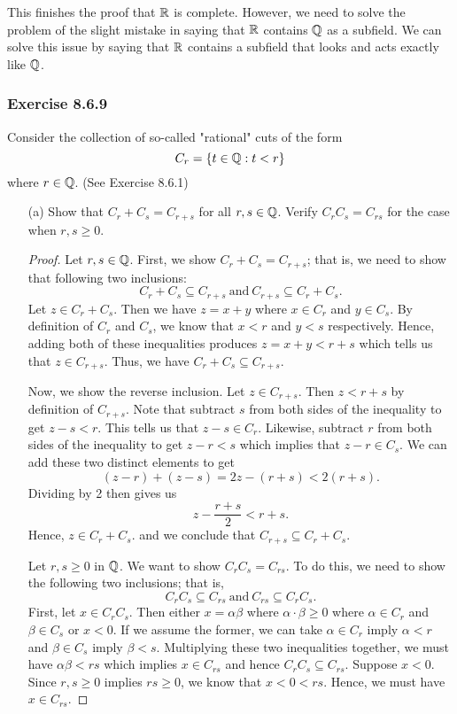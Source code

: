 This finishes the proof that \( \mathbb{R}  \) is complete. However, we need to solve the problem of the slight mistake in saying that \( \mathbb{R}  \) contains \( \mathbb{Q}  \) as a subfield. We can solve this issue by saying that \( \mathbb{R}  \) contains a subfield that looks and acts exactly like \( \mathbb{Q}  \).

\subsubsection{Exercise 8.6.9} Consider the collection of so-called "rational" cuts of the form 
\[  C_{r} = \{ t \in \mathbb{Q}  : t < r \}  \]
where \( r \in \mathbb{Q}  \). (See Exercise 8.6.1)
\begin{enumerate}
    \item[(a)] Show that \( C_{r} + C_{s} = C_{r+s} \) for all \( r,s \in \mathbb{Q}  \). Verify \( C_{r} C_{s} = C_{rs} \) for the case when \( r, s \geq 0  \).
        \begin{proof}
       Let \( r,s \in \mathbb{Q}  \). First, we show \( C_{r} + C_{s} = C_{r+s} \); that is, we need to show that following two inclusions:
       \[  C_{r } + C_{s} \subseteq C_{r+s} \ \text{and} \ C_{r+s} \subseteq C_{r} + C_{s}.   \]
    Let \( z \in C_{r} + C_{s} \). Then we have \( z = x + y   \) where \( x \in C_{r}  \) and \( y \in C_{s} \). By definition of \( C_{r} \) and \( C_{s } \), we know that \( x < r  \) and \( y < s  \) respectively. Hence, adding both of these inequalities produces \( z = x + y < r + s  \) which tells us that \( z \in C_{r+s} \). Thus, we have \( C_{r} + C_{s} \subseteq C_{r+s} \). 

    Now, we show the reverse inclusion. Let \( z \in C_{r+s} \). Then \( z < r + s  \) by definition of \( C_{r+s} \). Note that subtract \( s  \) from both sides of the inequality to get \( z - s < r  \). This tells us that \( z - s \in C_{r}  \). Likewise, subtract \( r  \) from both sides of the inequality to get \( z - r < s  \) which implies that \( z -r  \in C_{s} \). We can add these two distinct elements to get 
    \[ (z-r) + (z-s) = 2z - (r+s) < 2(r+s). \]
    Dividing by 2 then gives us 
    \[  z - \frac{ r+s }{ 2 }  < r + s. \]
    Hence, \( z \in C_{r} + C_{s}. \) and we conclude that \( C_{r+s} \subseteq C_{r} + C_{s} \).

    Let \( r, s \geq 0  \) in \( \mathbb{Q}  \). We want to show \( C_{r} C_{s} = C_{rs} \). To do this, we need to show the following two inclusions; that is, 
    \[  C_{r} C_{s} \subseteq C_{rs} \ \text{and} \ C_{rs} \subseteq C_{r} C_{s}. \]
    First, let \( x \in C_{r}  C_{s}   \). Then either \( x = \alpha  \beta  \) where \( \alpha \cdot \beta \geq   0  \) where \( \alpha \in C_{r} \) and \( \beta \in C_{s} \) or \( x < 0 \). If we assume the former, we can take \( \alpha \in C_{r}  \) imply \( \alpha < r  \) and \( \beta \in C_{s}  \) imply \( \beta < s  \). Multiplying these two inequalities together, we must have \( \alpha \beta < rs  \) which implies \( x  \in C_{rs}  \) and hence \( C_{r} C_{s} \subseteq C_{rs} \). Suppose \( x < 0  \). Since \( r, s \geq 0  \) implies \( rs \geq  0  \), we know that \( x < 0 < rs \). Hence, we must have \( x \in C_{rs} \).


\end{proof}
\end{enumerate}
